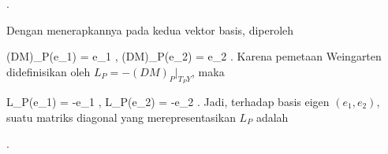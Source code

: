  { . }

Dengan menerapkannya pada kedua vektor basis, diperoleh

\mavergleichskettedisp
{\vergleichskette
{ (DM)_P(e_1)
}
{ =} { e_1
}
{ ,\quad }{ (DM)_P(e_2)
}
{ =} { e_2
}
{ } {
}
}
{}{}{.}
Karena pemetaan Weingarten didefinisikan oleh $L_P=-(DM)_P|_{T_PY}$, maka

\mavergleichskettedisp
{\vergleichskette
{ L_P(e_1)
}
{ =} { -e_1
}
{ ,\quad }{ L_P(e_2)
}
{ =} { -e_2
}
{ } {
}
}
{}{}{.}
Jadi, terhadap basis eigen $(e_1,e_2)$, suatu matriks diagonal yang merepresentasikan $L_P$ adalah

 { . }
